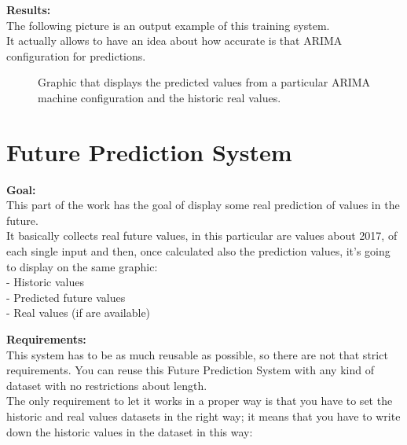 \textbf{Results:}\\
The following picture is an output example of this training system. \\
It actually allows to have an idea about how accurate is that ARIMA configuration for predictions.
\begin{figure}[H]
	\centering
    \caption{Graphic that displays the predicted values from a particular ARIMA machine configuration and the historic real values.}
\end{figure}


\newpage
\section{Future Prediction System}
\textbf{Goal:}\\ 
This part of the work has the goal of display some real prediction of values in the future. \\
It basically collects real future values, in this particular are values about 2017, of each single input and then, once calculated also the prediction values, it's going to display on the same graphic:\\
- Historic values\\
- Predicted future values\\
- Real values (if are available)

\textbf{Requirements:}\\
This system has to be as much reusable as possible, so there are not that strict requirements. You can reuse this Future Prediction System with any kind of dataset with no restrictions about length. \\
The only requirement to let it works in a proper way is that you have to set the historic and real values datasets in the right way; it means that you have to write down the historic values in the dataset in this way:


